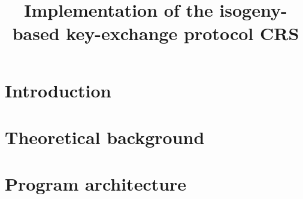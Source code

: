 \documentclass[12pt]{article}
\title{Implementation of the isogeny-based key-exchange protocol CRS}
\author{}
\date{}
\begin{document}
\maketitle
\renewcommand{\contentsname}{Table of content}
\tableofcontents
\newpage

%

\section{Introduction}


\section{Theoretical background}


\newpage
\section{Program architecture}


%
\end{document}
